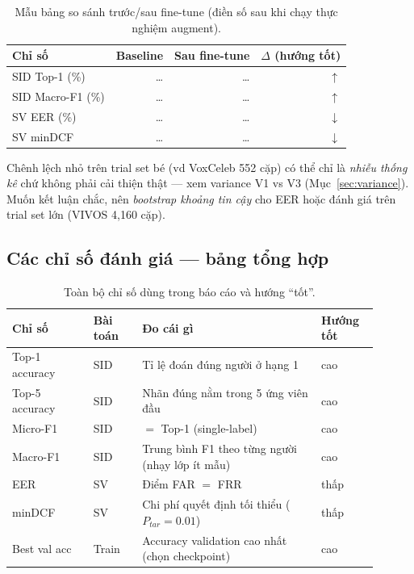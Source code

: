 \documentclass[12pt,a4paper]{article}
\begin{document}
\begin{table}[H]
\centering\small
\begin{tabular}{lrrr}
\toprule
\textbf{Chỉ số} & \textbf{Baseline} & \textbf{Sau fine-tune} & \textbf{$\Delta$ (hướng tốt)} \\
\midrule
SID Top-1 (\%) & \dots & \dots & $\uparrow$ \\
SID Macro-F1 (\%) & \dots & \dots & $\uparrow$ \\
SV EER (\%) & \dots & \dots & $\downarrow$ \\
SV minDCF & \dots & \dots & $\downarrow$ \\
\bottomrule
\end{tabular}
\caption{Mẫu bảng so sánh trước/sau fine-tune (điền số sau khi chạy thực nghiệm augment).}
\end{table}

\begin{luuybox}
Chênh lệch nhỏ trên trial set bé (vd VoxCeleb 552 cặp) có thể chỉ là \emph{nhiễu
thống kê} chứ không phải cải thiện thật --- xem variance V1 vs V3 (Mục~\ref{sec:variance}).
Muốn kết luận chắc, nên \emph{bootstrap khoảng tin cậy} cho EER hoặc đánh giá trên
trial set lớn (VIVOS 4{,}160 cặp).
\end{luuybox}

\subsection*{Các chỉ số đánh giá --- bảng tổng hợp}
\begin{table}[H]
\centering\small
\begin{tabular}{p{0.20\linewidth}p{0.12\linewidth}p{0.44\linewidth}p{0.14\linewidth}}
\toprule
\textbf{Chỉ số} & \textbf{Bài toán} & \textbf{Đo cái gì} & \textbf{Hướng tốt} \\
\midrule
Top-1 accuracy & SID & Tỉ lệ đoán đúng người ở hạng 1 & cao \\
Top-5 accuracy & SID & Nhãn đúng nằm trong 5 ứng viên đầu & cao \\
Micro-F1 & SID & $=$ Top-1 (single-label) & cao \\
Macro-F1 & SID & Trung bình F1 theo từng người (nhạy lớp ít mẫu) & cao \\
EER & SV & Điểm FAR $=$ FRR & thấp \\
minDCF & SV & Chi phí quyết định tối thiểu ($P_{tar}{=}0.01$) & thấp \\
Best val acc & Train & Accuracy validation cao nhất (chọn checkpoint) & cao \\
\bottomrule
\end{tabular}
\caption{Toàn bộ chỉ số dùng trong báo cáo và hướng ``tốt''.}
\end{table}
\end{document}
